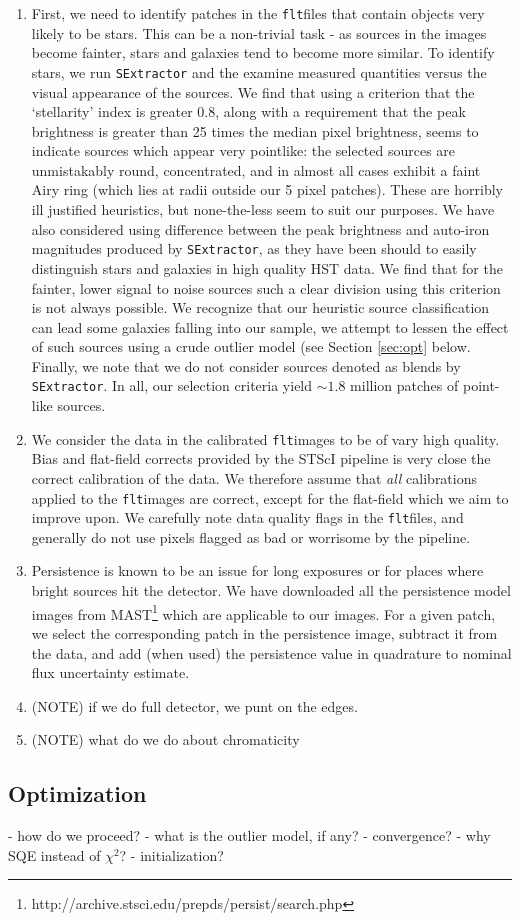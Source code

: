 \documentclass[12pt,preprint,pdftex]{aastex}
\newcommand{\flt}{\texttt{flt}}
\newcommand{\se}{\texttt{SExtractor}}
\begin{document}
\begin{enumerate}

\item First, we need to identify patches in 
the \flt files that contain objects very likely to be stars.  This can be a non-trivial task - as sources 
in the images become fainter, stars and galaxies tend to become more similar.   To identify stars, 
we run \se \citep{Bertin} and the examine measured quantities versus the visual 
appearance of the sources.  We find that using a criterion that the `stellarity' index is greater 0.8, 
along with a requirement that the peak brightness is greater than 25 times the median pixel 
brightness, seems to indicate sources which appear very pointlike: the selected sources are 
unmistakably round, concentrated, and in almost all cases exhibit a faint Airy ring (which lies at 
radii outside our 5 pixel patches).  These are horribly ill justified heuristics, but none-the-less 
seem to suit our purposes.  We have also considered using difference between the peak 
brightness and auto-iron magnitudes produced by \se, as they have been should to 
easily distinguish stars and galaxies in high quality HST data.  We find that for the fainter, lower 
signal to noise sources such a clear division using this criterion is not always possible.  We 
recognize that our heuristic source classification can lead some galaxies falling into our sample, 
we attempt to lessen the effect of such sources using a crude outlier model (see Section \ref{sec:opt} 
below.  Finally, we note that we do not consider sources denoted as blends by \se.  In all, our 
selection criteria yield $\sim1.8$ million patches of point-like sources.

\item We consider the data in the calibrated \flt images to be of vary high quality.  Bias and flat-field 
corrects provided by the STScI pipeline is very close the correct calibration of the data.  We 
therefore assume that \emph{all} calibrations applied to the \flt images are correct, except for the 
flat-field which we aim to improve upon.  We carefully note data quality flags in the \flt files, and 
generally do not use pixels flagged as bad or worrisome by the pipeline.  

\item Persistence is known to be an issue for long exposures or for places where bright sources 
hit the detector.  We have downloaded all the persistence model images from 
MAST\footnote{http://archive.stsci.edu/prepds/persist/search.php} which are applicable to our 
images.  For a given patch, we select the corresponding patch in the persistence image, subtract 
it from the data, and add (when used) the persistence value in quadrature to nominal flux 
uncertainty estimate.

\item (NOTE) if we do full detector, we punt on the edges.
\item (NOTE) what do we do about chromaticity

\end{enumerate}

\subsection{Optimization}

- how do we proceed?
- what is the outlier model, if any?
- convergence?
- why SQE instead of $\chi^2$?
- initialization?
\end{document}

